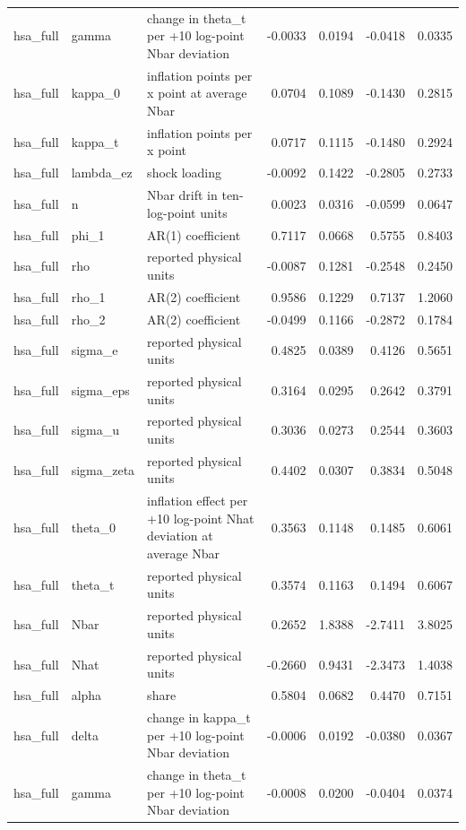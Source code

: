 \begin{tabular}{lllrrrr}
hsa\_full & gamma & change in theta\_t per +10 log-point Nbar deviation & -0.0033 & 0.0194 & -0.0418 & 0.0335 \\
hsa\_full & kappa\_0 & inflation points per x point at average Nbar & 0.0704 & 0.1089 & -0.1430 & 0.2815 \\
hsa\_full & kappa\_t & inflation points per x point & 0.0717 & 0.1115 & -0.1480 & 0.2924 \\
hsa\_full & lambda\_ez & shock loading & -0.0092 & 0.1422 & -0.2805 & 0.2733 \\
hsa\_full & n & Nbar drift in ten-log-point units & 0.0023 & 0.0316 & -0.0599 & 0.0647 \\
hsa\_full & phi\_1 & AR(1) coefficient & 0.7117 & 0.0668 & 0.5755 & 0.8403 \\
hsa\_full & rho & reported physical units & -0.0087 & 0.1281 & -0.2548 & 0.2450 \\
hsa\_full & rho\_1 & AR(2) coefficient & 0.9586 & 0.1229 & 0.7137 & 1.2060 \\
hsa\_full & rho\_2 & AR(2) coefficient & -0.0499 & 0.1166 & -0.2872 & 0.1784 \\
hsa\_full & sigma\_e & reported physical units & 0.4825 & 0.0389 & 0.4126 & 0.5651 \\
hsa\_full & sigma\_eps & reported physical units & 0.3164 & 0.0295 & 0.2642 & 0.3791 \\
hsa\_full & sigma\_u & reported physical units & 0.3036 & 0.0273 & 0.2544 & 0.3603 \\
hsa\_full & sigma\_zeta & reported physical units & 0.4402 & 0.0307 & 0.3834 & 0.5048 \\
hsa\_full & theta\_0 & inflation effect per +10 log-point Nhat deviation at average Nbar & 0.3563 & 0.1148 & 0.1485 & 0.6061 \\
hsa\_full & theta\_t & reported physical units & 0.3574 & 0.1163 & 0.1494 & 0.6067 \\
hsa\_full & Nbar & reported physical units & 0.2652 & 1.8388 & -2.7411 & 3.8025 \\
hsa\_full & Nhat & reported physical units & -0.2660 & 0.9431 & -2.3473 & 1.4038 \\
hsa\_full & alpha & share & 0.5804 & 0.0682 & 0.4470 & 0.7151 \\
hsa\_full & delta & change in kappa\_t per +10 log-point Nbar deviation & -0.0006 & 0.0192 & -0.0380 & 0.0367 \\
hsa\_full & gamma & change in theta\_t per +10 log-point Nbar deviation & -0.0008 & 0.0200 & -0.0404 & 0.0374 \\

\end{tabular}
